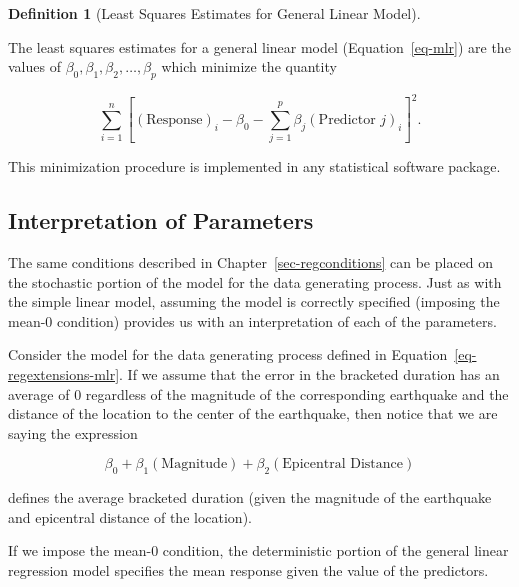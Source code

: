 \documentclass[
  letterpaper,
  DIV=11,
  numbers=noendperiod]{scrreprt}
\theoremstyle{definition}
\newtheorem{definition}{Definition}[chapter]
\theoremstyle{definition}
\theoremstyle{plain}
\theoremstyle{remark}
\begin{document}
\begin{definition}[Least Squares Estimates for General Linear
Model]\protect\hypertarget{def-mlr-least-squares-estimates}{}\label{def-mlr-least-squares-estimates}

The least squares estimates for a general linear model
(Equation~\ref{eq-mlr}) are the values of
\(\beta_0, \beta_1, \beta_2, \dotsc, \beta_p\) which minimize the
quantity

\[\sum_{i=1}^n \left[(\text{Response})_i - \beta_0 - \sum_{j=1}^{p} \beta_j(\text{Predictor } j)_{i}\right]^2.\]

\end{definition}

This minimization procedure is implemented in any statistical software
package.

\subsection{Interpretation of
Parameters}\label{interpretation-of-parameters}

The same conditions described in Chapter~\ref{sec-regconditions} can be
placed on the stochastic portion of the model for the data generating
process. Just as with the simple linear model, assuming the model is
correctly specified (imposing the mean-0 condition) provides us with an
interpretation of each of the parameters.

Consider the model for the data generating process defined in
Equation~\ref{eq-regextensions-mlr}. If we assume that the error in the
bracketed duration has an average of 0 regardless of the magnitude of
the corresponding earthquake and the distance of the location to the
center of the earthquake, then notice that we are saying the expression

\[\beta_0 + \beta_1(\text{Magnitude}) + \beta_2(\text{Epicentral Distance})\]

defines the average bracketed duration (given the magnitude of the
earthquake and epicentral distance of the location).

\begin{tcolorbox}[enhanced jigsaw, colbacktitle=quarto-callout-tip-color!10!white, colback=white, left=2mm, title=\textcolor{quarto-callout-tip-color}{\faLightbulb}\hspace{0.5em}{Big Idea}, toptitle=1mm, leftrule=.75mm, breakable, bottomrule=.15mm, arc=.35mm, rightrule=.15mm, toprule=.15mm, coltitle=black, opacityback=0, colframe=quarto-callout-tip-color-frame, opacitybacktitle=0.6, bottomtitle=1mm, titlerule=0mm]

If we impose the mean-0 condition, the deterministic portion of the
general linear regression model specifies the mean response given the
value of the predictors.

\end{tcolorbox}
\end{document}
